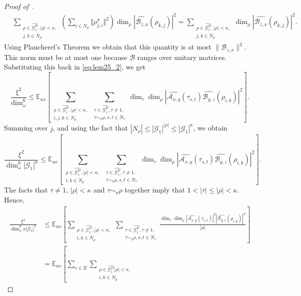 \documentclass[a4paper,11pt]{article}
\theoremstyle{definition}
\newcommand{\ex}[1]{\mathbb{E}_{#1}}
\newcommand{\gr}{\mathscr{G}}
\newcommand{\A}{\mathcal{A}}
\newcommand{\B}{\mathcal{B}}
\begin{document}
\begin{proof}[Proof of~]
\begin{align*}
 &
 \sum_{\substack{\rho\in \widehat{\gr_1^D},
 |\rho| < \kappa, \\ j,k\in N_\rho}}
 \left(\sum_{i\in N_\rho}
 \Vert \rho^\pi_{j,i} \Vert^2 \right)
  \dim_\rho
  \left\vert
 \widehat{{\B}_{z,x}}(\rho_{k,j})
 \right\vert^2
 =
 \sum_{\substack{\rho\in \widehat{\gr_1^D},
 |\rho| < \kappa, \\ j,k\in N_\rho}}
 \dim_\rho
 \left\vert
 \widehat{{\B}_{z,x}}(\rho_{k,j})
 \right\vert^2.    
\end{align*}
Using Plancherel's Theorem we obtain that this quantity is at most $\lVert {\B}_{z,x}\rVert^2$. This norm must be at most one because $\B$ ranges over unitary matrices. Substituting this back in \eqref{eq:lem25_2}, we get
\[
\frac{\xi^2}{\dim_\omega^6} 
\leq 
\ex{uv}
\left[
\sum_{\substack{\rho\in \widehat{\gr_1^D},
 |\rho| < \kappa, \\ i,j,k\in N_\rho}}
 \sum_{\substack{\tau\in \widehat{\gr_1^E}, \tau\neq 1, \\ \tau \sim_\pi \rho, s,t \in N_\tau}}
 \dim_\tau \dim_\rho
 \left\vert
  \widehat{\A_{x,y}}(\tau_{s,t})
 \widehat{{\B}_{y,z}}(\rho_{i,k}) \right\vert^2 \right].
\]
Summing over $j$, and using the fact that $|N_\rho| \leq
|\gr_1|^{|\rho|} \leq |\gr_1|^\kappa$, we obtain
\[
\frac{\xi^2}{\dim_\omega^6 |\gr_1|^\kappa} 
\leq
\ex{uv}
\left[
\sum_{\substack{\rho\in \widehat{\gr_1^D},
 |\rho| < \kappa, \\ i,k\in N_\rho}}
 \sum_{\substack{\tau\in \widehat{\gr_1^E}, \tau\neq 1, \\ \tau \sim_\pi \rho, s,t \in N_\tau}}
  \dim_\tau \dim_\rho
 \left\vert
 \widehat{\A_{x,y}}(\tau_{s,t})
 \widehat{{\B}_{y,z}}(\rho_{i,k}) \right\vert^2\right].
\]
%
 The facts that $\tau\neq 1$,
 $|\rho|<\kappa$ and $\tau \sim_\pi \rho$ together imply 
 that $1 < |\tau| \leq |\rho| < \kappa$.
 Hence,
\begin{align}
\nonumber
   \frac{\xi^2}{\dim_\omega^6 \kappa|\gr_1|^\kappa} 
& \leq 
\ex{uv}
\left[
\sum_{\substack{\rho\in \widehat{\gr_1^D},
 |\rho| < \kappa, \\ i,k\in N_\rho}}
 \sum_{\substack{\tau\in \widehat{\gr_1^E}, \tau\neq 1, \\ \tau \sim_\pi \rho, s,t \in N_\tau}}
 \frac{
  \dim_\tau \dim_\rho  \left\vert \widehat{\A_{x,y}}(\tau_{s,t})\right\vert^2
   \left\vert
 \widehat{{\B}_{y,z}}(\rho_{i,k})\right\vert^2}{|\rho|} 
 \right] \\
\nonumber
 &
= 
\ex{uv}
\left[
\sum_{e\in E}
\sum_{\substack{\rho\in \widehat{\gr_1^D} |\rho| < \kappa, \\ i,k\in N_\rho}}

\end{align}
\end{proof}
\end{document}
